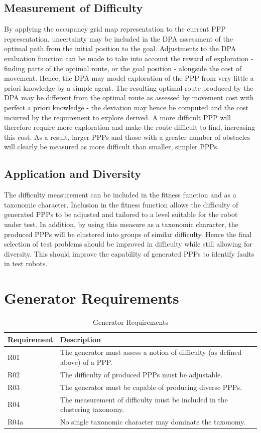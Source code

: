 \documentclass[authoryearcitations]{UoYCSproject}
\begin{document}
\subsection{Measurement of Difficulty}
\label{sec:pa3_measurement}
By applying the occupancy grid map representation to the current PPP representation, uncertainty may be included in the DPA assessment of the optimal path from the initial position to the goal. Adjustments to the DPA evaluation function can be made to take into account the reward of exploration - finding parts of the optimal route, or the goal position - alongside the cost of movement. Hence, the DPA may model exploration of the PPP from very little a priori knowledge by a simple agent. The resulting optimal route produced by the DPA may be different from the optimal route as assessed by movement cost with perfect a priori knowledge - the deviation may hence be computed and the cost incurred by the requirement to explore derived. A more difficult PPP will therefore require more exploration and make the route difficult to find, increasing this cost. As a result, larger PPPs and those with a greater number of obstacles will clearly be measured as more difficult than smaller, simpler PPPs.

\subsection{Application and Diversity}
\label{sec:pa3_app_div}
The difficulty measurement can be included in the fitness function and as a taxonomic character. Inclusion in the fitness function allows the difficulty of generated PPPs to be adjusted and tailored to a level suitable for the robot under test. In addition, by using this measure as a taxonomic character, the produced PPPs will be clustered into groups of similar difficulty. Hence the final selection of test problems should be improved in difficulty while still allowing for diversity. This should improve the capability of generated PPPs to identify faults in test robots.



\section{Generator Requirements}
\label{sec:pa4}
\begin{table}
\begin{tabular}{|l | p{9cm}|}
\hline
Requirement & Description \\
\hline
R01 & The generator must assess a notion of difficulty (as defined above) of a PPP.\\
R02 & The difficulty of produced PPPs must be adjustable.\\
R03 & The generator must be capable of producing diverse PPPs.\\
R04 & The measurement of difficulty must be included in the clustering taxonomy.\\
R04a & No single taxonomic character may dominate the taxonomy.\\
\hline
\end{tabular}
\caption{Generator Requirements}
\label{table:genreq}
\end{table}
\end{document}
